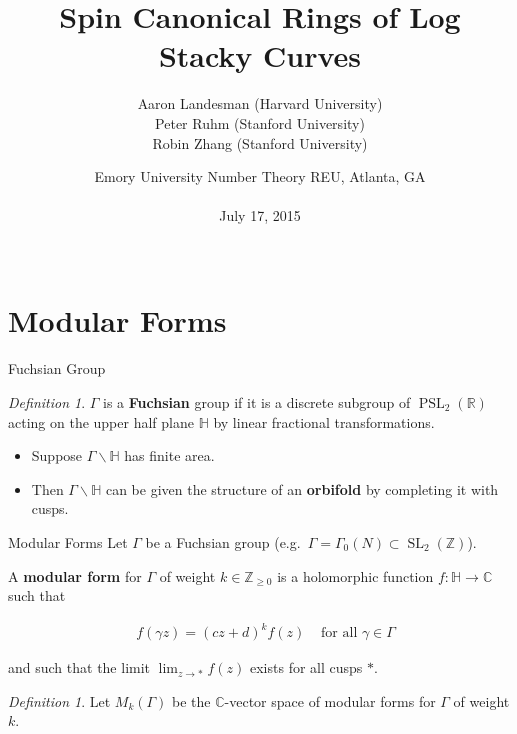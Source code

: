 \documentclass{beamer}
\title{Spin Canonical Rings of Log Stacky Curves}
\author[A. Landesman, P. Ruhm, and R. Zhang]{
Aaron Landesman (Harvard University) \\
Peter Ruhm (Stanford University) \\
Robin Zhang (Stanford University)
}
\date[July 17, 2015]{
Emory University Number Theory REU, Atlanta, GA\\
\mbox{}\\
July 17, 2015\\
\mbox{}\\
}
\theoremstyle{remark}
\newtheorem{defn}[thm]{Definition}
\newcommand\BH{{\mathbb H}}
\newcommand\BC{{\mathbb C}}
\newcommand\BR{{\mathbb R}}
\newcommand\BZ{{\mathbb Z}}
\newcommand{\SL}{\operatorname{SL}}
\newcommand{\PSL}{\operatorname{PSL}}
\begin{document}
\begin{frame}
	\titlepage
\end{frame}

\section{Modular Forms} 

\begin{frame}{Fuchsian Group}

\begin{defn}
$\Gamma$ is a {\bf Fuchsian} group if it is a discrete subgroup of
$\PSL_2(\BR)$ acting on the upper half plane $\BH$ by linear fractional transformations.
\end{defn}


\begin{itemize}
\item Suppose $\Gamma \backslash \BH$ has finite area. \\

\item Then $\Gamma \backslash \BH$ can be given the structure of an {\bf{orbifold}} by completing it with cusps.  
\end{itemize}

\end{frame}


\begin{frame}{Modular Forms}
Let $\Gamma$  be a Fuchsian group (e.g.~$\Gamma = \Gamma_0(N) \subset \SL_2(\BZ)$).

\begin{definition}
A \textbf{modular form} for $\Gamma$ of weight $k \in \BZ_{\geq 0}$ is a holomorphic function $f \colon \BH \to \BC$ such that

\begin{align*}
	&f(\gamma z) = (cz+d)^k f(z) &\text{ for all } \gamma \in \Gamma 
\end{align*}

\noindent
and such that the limit $\lim_{z \to *} f(z)$ exists for all cusps $*$.
\end{definition}


\begin{defn}
  Let $M_k(\Gamma)$ be the $\BC$-vector space of modular forms for $\Gamma$ of weight $k$.    
\end{defn}

\end{frame}
\end{document}
